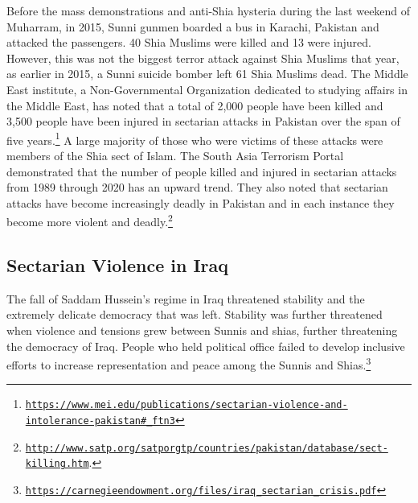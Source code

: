 \documentclass[10pt, letterpaper]{article}
\begin{document}
Before the mass demonstrations and anti-Shia hysteria during the last
weekend of Muharram, in 2015, Sunni gunmen boarded a bus in Karachi,
Pakistan and attacked the passengers. 40 Shia Muslims were killed and 13
were injured. However, this was not the biggest terror attack against
Shia Muslims that year, as earlier in 2015, a Sunni suicide bomber left
61 Shia Muslims dead. The Middle East institute, a Non-Governmental
Organization dedicated to studying affairs in the Middle East, has noted
that a total of 2,000 people have been killed and 3,500 people have been
injured in sectarian attacks in Pakistan over the span of five
years.\footnote{\texttt{\href{https://www.mei.edu/publications/sectarian-violence-and-intolerance-pakistan\#_ftn3}{{https://www.mei.edu/publications/sectarian-violence-and-intolerance-pakistan\#\_ftn3}}}}
A large majority of those who were victims of these attacks were members
of the Shia sect of Islam. The South Asia Terrorism Portal demonstrated
that the number of people killed and injured in sectarian attacks from
1989 through 2020 has an upward trend. They also noted that sectarian
attacks have become increasingly deadly in Pakistan and in each instance
they become more violent and deadly.\footnote{\texttt{\href{http://www.satp.org/satporgtp/countries/pakistan/database/sect-killing.htm}{{http://www.satp.org/satporgtp/countries/pakistan/database/sect-killing.htm}}}.} \\

\subsection{Sectarian Violence in Iraq}

The fall of Saddam Hussein's regime in Iraq threatened stability and the
extremely delicate democracy that was left. Stability was further
threatened when violence and tensions grew between Sunnis and shias,
further threatening the democracy of Iraq. People who held political
office failed to develop inclusive efforts to increase representation
and peace among the Sunnis and Shias.\footnote{\texttt{\href{https://carnegieendowment.org/files/iraq_sectarian_crisis.pdf}{{https://carnegieendowment.org/files/iraq\_sectarian\_crisis.pdf}}}} \\
\end{document}
